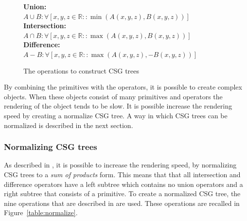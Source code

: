 \documentclass[a4wide,10pt,twocolumn]{article}
\begin{document}
    \begin{figure}[h]
        {\fontsize{8.7}{10}\selectfont
        \textbf{Union:}\\
        $A \cup B: \forall[x,y,z \in \mathbb{R} :: \min(A(x, y, z), B(x, y, z))]$ \\

        \textbf{Intersection:}\\
        $A \cap B: \forall[x,y,z \in \mathbb{R} :: \max(A(x, y, z), B(x, y, z))]$ \\

        \textbf{Difference:}\\
        $A - B: \forall[x,y,z \in \mathbb{R} :: \max(A(x, y, z), -B(x, y, z))]$
        }
        \caption{The operations to construct CSG trees}
        \label{figure:operations}
    \end{figure}

    By combining the primitives with the operators, it is possible to create complex objects. When these objects consist of many primitives and operators the rendering of the object tends to be slow. It is possible increase the rendering speed by creating a normalize CSG tree. A way in which CSG trees can be normalized is described in the next section.

\subsubsection{Normalizing CSG trees}
    As described in \cite{Wiegand96}, it is possible to increase the rendering speed, by normalizing CSG trees to a \textit{sum of products} form. This means that that all intersection and difference operators have a left subtree which contains no union operators and a right subtree that consists of a primitive. To create a normalized CSG tree, the nine operations that are described in \cite{Wiegand96} are used. These operations are recalled in Figure~\ref{table:normalize}.
\end{document}
